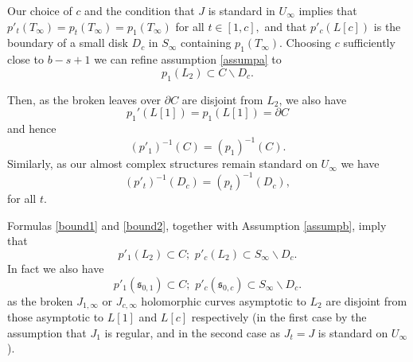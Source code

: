 \documentclass[12pt]{amsart}
\theoremstyle{definition}
\begin{document}

Our choice of $c$ and the condition that $J$ is standard in $U_\infty$ implies that  $p'_t(T_\infty) = p_t(T_\infty) = p_1(T_\infty)$ for all $t \in [1,c],$ and that $p'_c(L[c])$ is the boundary of a small disk $D_c$ in $S_\infty$ containing $p_1(T_\infty)$. Choosing  $c$ sufficiently close to $b-s+1$ we can refine assumption \eqref{assumpa} to 
\begin{equation}\label{assumpb}
p_1(L_2) \subset C \smallsetminus D_c.    
\end{equation}

Then, as the broken leaves over $\partial C$ are disjoint from $L_2$, we also have
\begin{equation}\label{bound}
    p_1'(L[1])= p_1(L[1]) = \partial C
\end{equation} and hence 
\begin{equation}\label{bound1}
    (p'_1)^{-1}(C)= (p_1)^{-1}(C).
\end{equation}
Similarly, as our almost complex structures remain standard on $U_{\infty}$ we have  
\begin{equation}\label{bound2}
    (p'_t)^{-1}(D_c)= (p_t)^{-1}(D_c),
\end{equation}
for all $t$.

Formulas \eqref{bound1} and \eqref{bound2}, together with Assumption \eqref{assumpb}, imply that
\begin{equation}\label{assumpc}
p'_1(L_2) \subset C; \, \, p'_c(L_2) \subset S_{\infty} \smallsetminus D_c.    
\end{equation}
In fact we also have
\begin{equation}\label{assumpc2}
p'_1(\mathfrak{s}_{0,1}) \subset C; \, \, p'_c(\mathfrak{s}_{0,c}) \subset S_{\infty} \smallsetminus D_c.    
\end{equation}
as the broken $J_{1,\infty}$ or $J_{c,\infty}$ holomorphic curves asymptotic to $L_2$ are disjoint from those asymptotic to $L[1]$ and $L[c]$ respectively (in the first case by the assumption that $J_1$ is regular, and in the second case as $J_t=J$ is standard on $U_{\infty}$).
\end{document}
